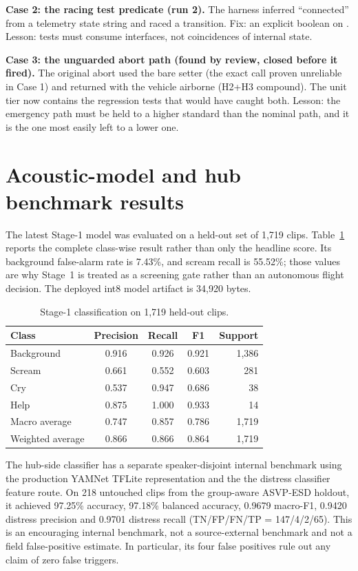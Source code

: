 \documentclass[12pt,a4paper]{report}
\renewcommand{\texttt}[1]{\ifmmode\text{\rmfamily #1}\else{\rmfamily #1}\fi}
\begin{document}
\textbf{Case 2: the racing test predicate (run 2).} The harness
inferred ``connected'' from a telemetry state string and raced a
transition. Fix: an explicit boolean on \texttt{/health}. Lesson:
tests must consume interfaces, not coincidences of internal
state.

\textbf{Case 3: the unguarded abort path (found by review, closed
before it fired).} The original abort used the bare setter (the
exact call proven unreliable in Case 1) and returned with the
vehicle airborne (H2+H3 compound). The unit tier now contains the
regression tests that would have caught both. Lesson: the
emergency path must be held to a higher standard than the nominal
path, and it is the one most easily left to a lower one.

\section{Acoustic-model and hub benchmark results}
\label{sec:acoustic-results}

The latest Stage-1 model was evaluated on a held-out set of 1,719
clips. Table~\ref{tab:stage1results} reports the complete class-wise
result rather than only the headline score. Its background false-alarm
rate is 7.43\%, and scream recall is 55.52\%; those values are why
Stage~1 is treated as a screening gate rather than an autonomous
flight decision. The deployed int8 model artifact is 34,920 bytes.

\begin{table}[htbp]
\centering
\caption{Stage-1 classification on 1,719 held-out clips.}
\label{tab:stage1results}
\renewcommand{\arraystretch}{1.15}
\begin{tabular}{|l|c|c|c|r|}
\hline
\textbf{Class} & \textbf{Precision} & \textbf{Recall} & \textbf{F1} & \textbf{Support} \\
\hline
Background & 0.916 & 0.926 & 0.921 & 1,386 \\\hline
Scream & 0.661 & 0.552 & 0.603 & 281 \\\hline
Cry & 0.537 & 0.947 & 0.686 & 38 \\\hline
Help & 0.875 & 1.000 & 0.933 & 14 \\\hline
Macro average & 0.747 & 0.857 & 0.786 & 1,719 \\\hline
Weighted average & 0.866 & 0.866 & 0.864 & 1,719 \\\hline
\end{tabular}
\end{table}

The hub-side classifier has a separate speaker-disjoint internal
benchmark using the production YAMNet TFLite representation and the
the distress classifier feature route. On 218 untouched clips from
the group-aware ASVP-ESD holdout, it achieved 97.25\% accuracy,
97.18\% balanced accuracy, 0.9679 macro-F1, 0.9420 distress precision
and 0.9701 distress recall (TN/FP/FN/TP = 147/4/2/65). This is an
encouraging internal benchmark, not a source-external benchmark and
not a field false-positive estimate. In particular, its four false
positives rule out any claim of zero false triggers.
\end{document}
